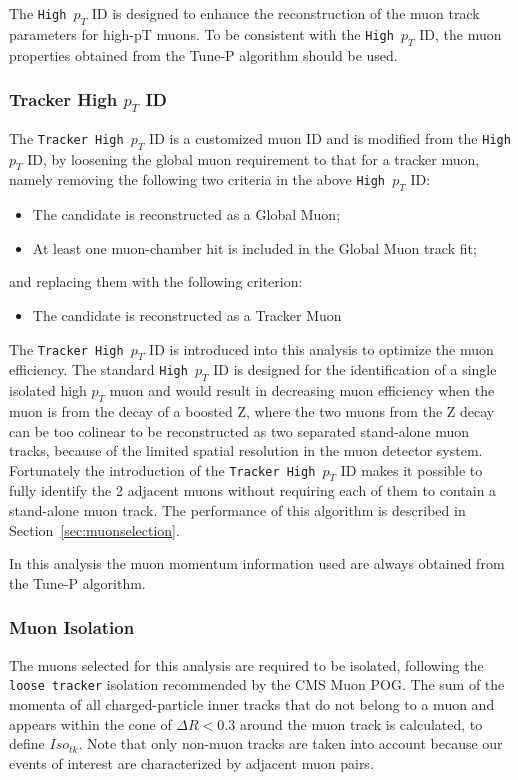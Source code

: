 The \texttt{High $p_T$} ID is designed to enhance the reconstruction of the muon track parameters for high-pT muons. To be consistent with the \texttt{High $p_T$} ID, the muon properties obtained from the Tune-P algorithm should be used.

\subsubsection{Tracker High $p_T$ ID}
The \texttt{Tracker High $p_T$} ID is a customized muon ID and is modified from the \texttt{High $p_T$} ID, by loosening the global muon requirement to that for a tracker muon, namely removing the following two criteria in the above \texttt{High $p_T$} ID:
\begin{itemize}
\item  The candidate is reconstructed as a Global Muon;
\item  At least one muon-chamber hit is included in the Global Muon track fit;
\end{itemize}
and replacing them with the following criterion:
\begin{itemize}
\item  The candidate is reconstructed as a Tracker Muon 
\end{itemize}

The \texttt{Tracker High $p_T$} ID is introduced into this analysis to optimize the muon efficiency. The standard \texttt{High $p_T$} ID is designed for the identification of a single isolated high $p_T$ muon and would result in decreasing muon efficiency when the muon is from the decay of a boosted Z, where the two muons from the Z decay can be too colinear to be reconstructed as two separated stand-alone muon tracks, because of the limited spatial resolution in the muon detector system. Fortunately the introduction of the \texttt{Tracker High $p_T$} ID makes it possible to fully identify the 2 adjacent muons without requiring each of them to contain a stand-alone muon track. The performance of this algorithm is described in Section~\ref{sec:muonselection}.

\vspace{0.3cm}
In this analysis the muon momentum information used are always obtained from the Tune-P algorithm.

\subsubsection{Muon Isolation}
The muons selected for this analysis are required to be isolated, following the \texttt{loose tracker} isolation recommended by the CMS Muon POG. The sum of the momenta of all charged-particle inner tracks that do not belong to a muon and appears within the cone of $\Delta R<0.3$ around the muon track is calculated, to define $Iso_{tk}$. Note that only non-muon tracks are taken into account because our events of interest are characterized by adjacent muon pairs.

